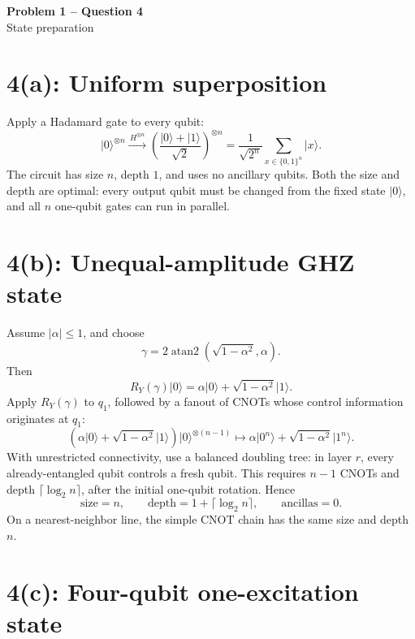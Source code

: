 \documentclass[11pt]{article}
\newcommand{\ket}[1]{\lvert #1\rangle}
\begin{document}
\begin{center}
  {\Large\bfseries Problem 1 -- Question 4}\\[0.3em]
  {\large State preparation}
\end{center}

\section*{4(a): Uniform superposition}

Apply a Hadamard gate to every qubit:
\[
 \ket{0}^{\otimes n}
 \xrightarrow{\,H^{\otimes n}\,}
 \left(\frac{\ket0+\ket1}{\sqrt2}\right)^{\otimes n}
 =\frac{1}{\sqrt{2^n}}\sum_{x\in\{0,1\}^n}\ket{x}.
\]
The circuit has size \(n\), depth \(1\), and uses no ancillary qubits.
Both the size and depth are optimal: every output qubit must be changed
from the fixed state \(\ket0\), and all \(n\) one-qubit gates can run in
parallel.

\section*{4(b): Unequal-amplitude GHZ state}

Assume \(|\alpha|\leq1\), and choose
\[
 \gamma=2\operatorname{atan2}\left(\sqrt{1-\alpha^2},\alpha\right).
\]
Then
\[
 R_Y(\gamma)\ket0
 =\alpha\ket0+\sqrt{1-\alpha^2}\ket1.
\]
Apply \(R_Y(\gamma)\) to \(q_1\), followed by a fanout of CNOTs whose
control information originates at \(q_1\):
\[
\left(\alpha\ket0+\sqrt{1-\alpha^2}\ket1\right)\ket{0}^{\otimes(n-1)}
\longmapsto
\alpha\ket{0^n}+\sqrt{1-\alpha^2}\ket{1^n}.
\]
With unrestricted connectivity, use a balanced doubling tree: in layer
\(r\), every already-entangled qubit controls a fresh qubit. This requires
\(n-1\) CNOTs and depth \(\lceil\log_2 n\rceil\), after the initial
one-qubit rotation. Hence
\[
 \text{size}=n,\qquad
 \text{depth}=1+\lceil\log_2 n\rceil,\qquad
 \text{ancillas}=0.
\]
On a nearest-neighbor line, the simple CNOT chain has the same size and
depth \(n\).

\section*{4(c): Four-qubit one-excitation state}
\end{document}
